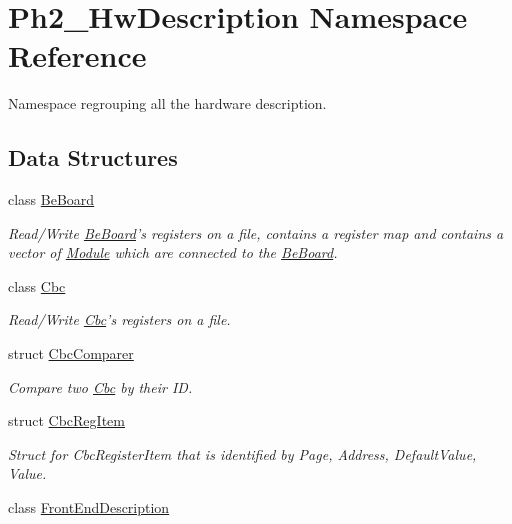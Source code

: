 \hypertarget{namespace_ph2___hw_description}{\section{Ph2\-\_\-\-Hw\-Description Namespace Reference}
\label{namespace_ph2___hw_description}
}


Namespace regrouping all the hardware description.  


\subsection*{Data Structures}
\begin{DoxyCompactItemize}
\item 
class \hyperlink{class_ph2___hw_description_1_1_be_board}{Be\-Board}
\begin{DoxyCompactList}\small\item\em Read/\-Write \hyperlink{class_ph2___hw_description_1_1_be_board}{Be\-Board}'s registers on a file, contains a register map and contains a vector of \hyperlink{class_ph2___hw_description_1_1_module}{Module} which are connected to the \hyperlink{class_ph2___hw_description_1_1_be_board}{Be\-Board}. \end{DoxyCompactList}\item 
class \hyperlink{class_ph2___hw_description_1_1_cbc}{Cbc}
\begin{DoxyCompactList}\small\item\em Read/\-Write \hyperlink{class_ph2___hw_description_1_1_cbc}{Cbc}'s registers on a file. \end{DoxyCompactList}\item 
struct \hyperlink{struct_ph2___hw_description_1_1_cbc_comparer}{Cbc\-Comparer}
\begin{DoxyCompactList}\small\item\em Compare two \hyperlink{class_ph2___hw_description_1_1_cbc}{Cbc} by their I\-D. \end{DoxyCompactList}\item 
struct \hyperlink{struct_ph2___hw_description_1_1_cbc_reg_item}{Cbc\-Reg\-Item}
\begin{DoxyCompactList}\small\item\em Struct for Cbc\-Register\-Item that is identified by Page, Address, Default\-Value, Value. \end{DoxyCompactList}\item 
class \hyperlink{class_ph2___hw_description_1_1_front_end_description}{Front\-End\-Description}

\end{DoxyCompactItemize}
